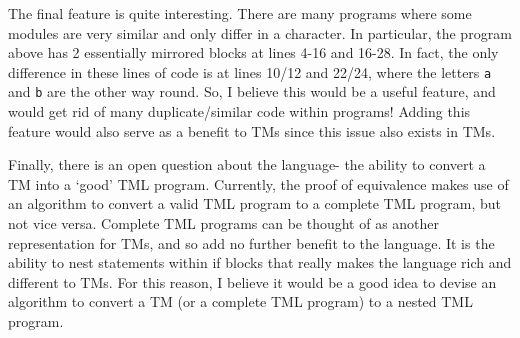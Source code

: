 
The final feature is quite interesting. There are many programs where some modules are very similar and only differ in a character. In particular, the program above has 2 essentially mirrored blocks at lines 4-16 and 16-28. In fact, the only difference in these lines of code is at lines 10/12 and 22/24, where the letters \texttt{a} and \texttt{b} are the other way round. So, I believe this would be a useful feature, and would get rid of many duplicate/similar code within programs! Adding this feature would also serve as a benefit to TMs since this issue also exists in TMs.

Finally, there is an open question about the language- the ability to convert a TM into a `good' TML program. Currently, the proof of equivalence makes use of an algorithm to convert a valid TML program to a complete TML program, but not vice versa. Complete TML programs can be thought of as another representation for TMs, and so add no further benefit to the language. It is the ability to nest statements within if blocks that really makes the language rich and different to TMs. For this reason, I believe it would be a good idea to devise an algorithm to convert a TM (or a complete TML program) to a nested TML program.



